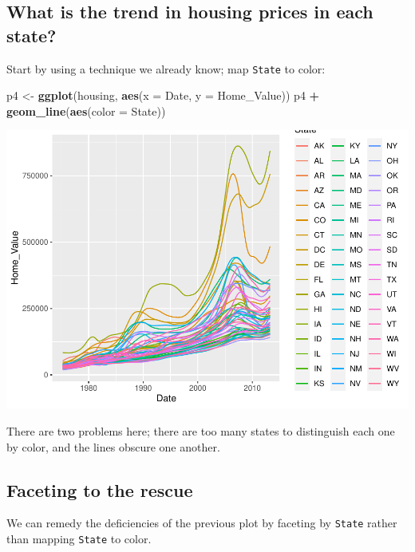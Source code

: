 \documentclass[
]{book}
\newenvironment{Shaded}{\begin{snugshade}}{\end{snugshade}}
\newcommand{\DataTypeTok}[1]{\textcolor[rgb]{0.13,0.29,0.53}{#1}}
\newcommand{\KeywordTok}[1]{\textcolor[rgb]{0.13,0.29,0.53}{\textbf{#1}}}
\newcommand{\NormalTok}[1]{#1}
\newcommand{\OperatorTok}[1]{\textcolor[rgb]{0.81,0.36,0.00}{\textbf{#1}}}
\newcommand{\StringTok}[1]{\textcolor[rgb]{0.31,0.60,0.02}{#1}}
\begin{document}
\hypertarget{what-is-the-trend-in-housing-prices-in-each-state}{%
\subsection{What is the trend in housing prices in each state?}\label{what-is-the-trend-in-housing-prices-in-each-state}}

Start by using a technique we already know; map \texttt{State} to color:

\begin{Shaded}
\begin{Highlighting}[]
\NormalTok{p4 \textless{}{-}}\StringTok{ }\KeywordTok{ggplot}\NormalTok{(housing, }\KeywordTok{aes}\NormalTok{(}\DataTypeTok{x =}\NormalTok{ Date, }\DataTypeTok{y =}\NormalTok{ Home\_Value))}
\NormalTok{p4 }\OperatorTok{+}\StringTok{ }\KeywordTok{geom\_line}\NormalTok{(}\KeywordTok{aes}\NormalTok{(}\DataTypeTok{color =}\NormalTok{ State))  }
\end{Highlighting}
\end{Shaded}

\includegraphics{R/Rgraphics/figures/unnamed-chunk-193-1.pdf}

There are two problems here; there are too many states to distinguish each one by color, and the lines obscure one another.

\hypertarget{faceting-to-the-rescue}{%
\subsection{Faceting to the rescue}\label{faceting-to-the-rescue}}

We can remedy the deficiencies of the previous plot by faceting by \texttt{State} rather than mapping \texttt{State} to color.
\end{document}
